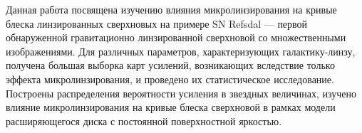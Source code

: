 Данная работа посвящена изучению влияния микролинзирования на кривые блеска линзированных сверхновых на примере SN Refsdal — первой обнаруженной гравитационно линзированной сверхновой со множественными изображениями. Для различных параметров, характеризующих галактику-линзу, получена большая выборка карт усилений, возникающих вследствие только эффекта микролинзирования, и проведено их статистическое исследование. Построены распределения вероятности усиления в звездных величинах, изучено влияние микролинзирования на кривые блеска сверхновой в рамках модели расширяющегося диска с постоянной поверхностной яркостью.
